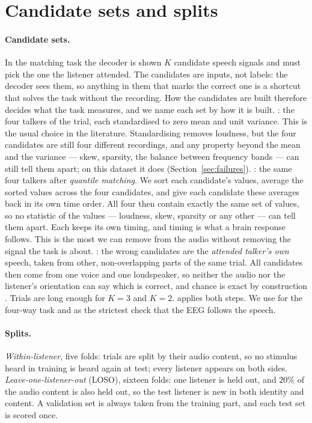 \section{Candidate sets and splits}
\label{sec:setting}

\paragraph{Candidate sets.}
\label{sec:constructions}
In the matching task the decoder is shown $K$ candidate speech signals and must
pick the one the listener attended. The candidates are inputs, not labels: the
decoder sees them, so anything in them that marks the correct one is a shortcut
that solves the task without the recording. How the candidates are built
therefore decides what the task measures, and we name each set by how it is
built. \cUnm{}: the four talkers of the trial, each standardised to zero mean
and unit variance. This is the usual choice in the literature. Standardising
removes loudness, but the four candidates are still four different recordings,
and any property beyond the mean and the variance --- skew, sparsity, the balance
between frequency bands --- can still tell them apart; on this dataset it does
(Section~\ref{sec:failures}). \cMat{}: the same four talkers after
\emph{quantile matching}. We sort each candidate's values, average the sorted
values across the four candidates, and give each candidate these averages back in
its own time order. All four then contain exactly the same set of values, so no
statistic of the values --- loudness, skew, sparsity or any other --- can tell
them apart. Each keeps its own timing, and timing is what a brain response
follows. This is the most we can remove from the audio without removing the
signal the task is about. \cSame{}: the wrong candidates are the \emph{attended
talker's own} speech, taken from other, non-overlapping parts of the same trial.
All candidates then come from one voice and one loudspeaker, so neither the
audio nor the listener's orientation can say which is correct, and chance is
exact by construction \citep{accou2021}. Trials are long enough for $K\!=\!3$ and
$K\!=\!2$. \cSameM{} applies both steps. We use \cMat{} for the four-way task
and \cSameM{} as the strictest check that the EEG follows the speech.

\paragraph{Splits.}
\emph{Within-listener}, five folds: trials are split by their audio content, so no
stimulus heard in training is heard again at test; every listener appears on both
sides. \emph{Leave-one-listener-out} (LOSO), sixteen folds: one listener is held
out, and $20\%$ of the audio content is also held out, so the test listener is new
in both identity and content. A validation set is always taken from the training
part, and each test set is scored once.
